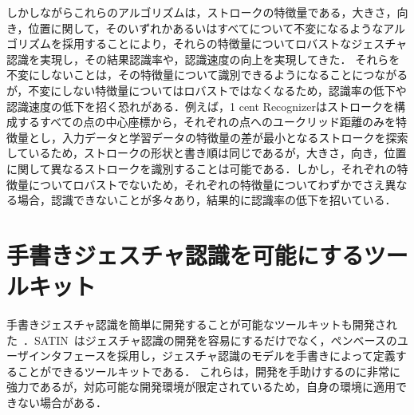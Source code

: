 しかしながらこれらのアルゴリズムは，ストロークの特徴量である，大きさ，向き，位置に関して，そのいずれかあるいはすべてについて不変になるようなアルゴリズムを採用することにより，それらの特徴量についてロバストなジェスチャ認識を実現し，その結果認識率や，認識速度の向上を実現してきた．
それらを不変にしないことは，その特徴量について識別できるようになることにつながるが，不変にしない特徴量についてはロバストではなくなるため，認識率の低下や認識速度の低下を招く恐れがある．例えば，1 cent Recognizerはストロークを構成するすべての点の中心座標から，それぞれの点へのユークリッド距離のみを特徴量とし，入力データと学習データの特徴量の差が最小となるストロークを探索しているため，ストロークの形状と書き順は同じであるが，大きさ，向き，位置に関して異なるストロークを識別することは可能である．しかし，それぞれの特徴量についてロバストでないため，それぞれの特徴量についてわずかでさえ異なる場合，認識できないことが多々あり，結果的に認識率の低下を招いている．

\section{手書きジェスチャ認識を可能にするツールキット}
手書きジェスチャ認識を簡単に開発することが可能なツールキットも開発された~\cite{Henry:1990:IGS:97924.97938,Landay:1993:EEU:259964.260123,Myers:1997:AEN:262050.260628}．SATIN~\cite{Hong:2000:STI:354401.354412}はジェスチャ認識の開発を容易にするだけでなく，ペンベースのユーザインタフェースを採用し，ジェスチャ認識のモデルを手書きによって定義することができるツールキットである．
これらは，開発を手助けするのに非常に強力であるが，対応可能な開発環境が限定されているため，自身の環境に適用できない場合がある．

